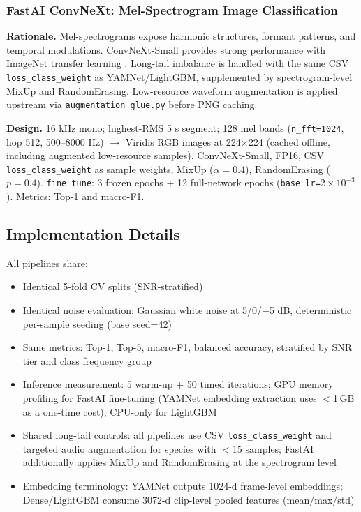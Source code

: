 \documentclass[conference]{IEEEtran}
\begin{document}
\subsubsection{FastAI ConvNeXt: Mel-Spectrogram Image Classification}

\textbf{Rationale.} Mel-spectrograms expose harmonic structures, formant patterns, and temporal modulations. ConvNeXt-Small provides strong performance with ImageNet transfer learning \cite{miyaguchi2023transfer, witting2024addressing}. Long-tail imbalance is handled with the same CSV \texttt{loss\_class\_weight} as YAMNet/LightGBM, supplemented by spectrogram-level MixUp and RandomErasing. Low-resource waveform augmentation is applied upstream via \texttt{augmentation\_glue.py} before PNG caching.

\textbf{Design.} 16 kHz mono; highest-RMS 5 s segment; 128 mel bands (\texttt{n\_fft=1024}, hop 512, 500--8000 Hz) $\rightarrow$ Viridis RGB images at 224$\times$224 (cached offline, including augmented low-resource samples). ConvNeXt-Small, FP16, CSV \texttt{loss\_class\_weight} as sample weights, MixUp ($\alpha=0.4$), RandomErasing ($p=0.4$). \texttt{fine\_tune}: 3 frozen epochs + 12 full-network epochs (\texttt{base\_lr=$2\times10^{-3}$}). Metrics: Top-1 and macro-F1.

\subsection{Implementation Details}

All pipelines share:

\begin{itemize}
    \item Identical 5-fold CV splits (SNR-stratified)
    \item Identical noise evaluation: Gaussian white noise at 5/0/$-$5 dB, deterministic per-sample seeding (base seed=42)
    \item Same metrics: Top-1, Top-5, macro-F1, balanced accuracy, stratified by SNR tier and class frequency group
    \item Inference measurement: 5 warm-up + 50 timed iterations; GPU memory profiling for FastAI fine-tuning (YAMNet embedding extraction uses $<$1\,GB as a one-time cost); CPU-only for LightGBM
    \item Shared long-tail controls: all pipelines use CSV \texttt{loss\_class\_weight} and targeted audio augmentation for species with $<$15 samples; FastAI additionally applies MixUp and RandomErasing at the spectrogram level
    \item Embedding terminology: YAMNet outputs 1024-d frame-level embeddings; Dense/LightGBM consume 3072-d clip-level pooled features (mean/max/std)
\end{itemize}
\end{document}
